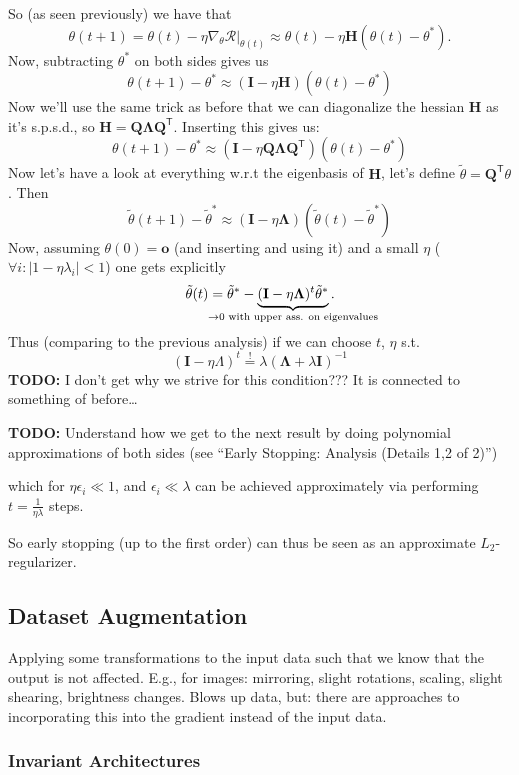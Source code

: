 \documentclass[a2paper,8pt]{extarticle}
\newcommand{\cR}{\mathcal{R}}
\newcommand{\abs}[1]{\left\lvert #1 \right\rvert}
\newcommand*{\T}{\mathsf{T}}
\newcommand{\mbeq}{\stackrel{!}{=}}
\newcommand{\mat}[1]{\mathbf{#1}}
\renewcommand{\vec}[1]{\mathbf{#1}}
\newcommand{\vo}{\vec{o}}
\newcommand{\MH}{\mat{H}}
\newcommand{\MI}{\mat{I}}
\newcommand{\MQ}{\mat{Q}}
\newcommand{\MLambda}{\mat{\Lambda}}
\newcommand{\evalat}[2]{\left. #1 \right|_{#2}}
\newcommand{\todo}[1]{\textbf{TODO:} #1}
\newcommand{\todo}[1]{%
}
\begin{document}
\begin{landscape}
\begin{multicols*}{7}
So (as seen previously) we have that
\[
\theta(t+1)
=
\theta(t)
-\evalat{\eta
\nabla_{\theta}\cR}{\theta(t)}
\approx
\theta(t)-\eta\MH(\theta(t)-\theta^*).
\]
Now, subtracting $\theta^*$ on both sides gives us
\[
\theta(t+1)-\theta^*\approx
(\MI-\eta\MH)(\theta(t)-\theta^*)
\]
Now we'll use the same trick as before that we can diagonalize the hessian $\MH$
as it's s.p.s.d., so $\MH=\MQ\MLambda\MQ^\T$. Inserting this gives us:
\[
\theta(t+1)-\theta^*\approx
(\MI-\eta\MQ\MLambda\MQ^\T)(\theta(t)-\theta^*)
\]
Now let's have a look at everything w.r.t the eigenbasis of $\MH$, let's define
$\tilde{\theta}=\MQ^\T\theta$. Then
\[
\tilde{\theta}(t+1)-\tilde{\theta}^*\approx
(\MI-\eta\MLambda)(\tilde{\theta}(t)-\tilde{\theta}^*)
\]
Now, assuming $\theta(0)=\vo$ (and inserting and using it) and a small $\eta$
($\forall i\colon \abs{1-\eta\lambda_i}<1$) one gets explicitly
\[
\tilde{\theta}(t)=\tilde{\theta}^* -
\underbrace{(\MI-\eta\MLambda)^t\tilde{\theta}^*}_{\mathclap{\to 0\text{ with
upper ass. on eigenvalues}}}.
\]
Thus (comparing to the previous analysis) if we can choose $t$, $\eta$ s.t.
\[
(\MI-\eta\Lambda)^t\mbeq\lambda(\MLambda+\lambda\MI)^{-1}
\]
\todo{I don't get why we strive for this condition??? It is connected to
something of before\ldots}

\todo{Understand how we get to the next result by doing polynomial
approximations of both sides (see ``Early Stopping: Analysis (Details 1,2 of
2)'')}

which for $\eta\epsilon_i\ll 1$, and $\epsilon_i\ll\lambda$ can be achieved
approximately via performing $t=\frac{1}{\eta\lambda}$ steps.

So early stopping (up to the first order) can thus be seen as an approximate
$L_2$-regularizer.

\subsection{Dataset Augmentation}

Applying some transformations to the input data such that we know that the
output is not affected. E.g., for images: mirroring, slight rotations, scaling,
slight shearing, brightness changes. Blows up data, but: there are approaches to
incorporating this into the gradient instead of the input data.

\subsubsection{Invariant Architectures}


\end{multicols*}
\end{landscape}
\end{document}
